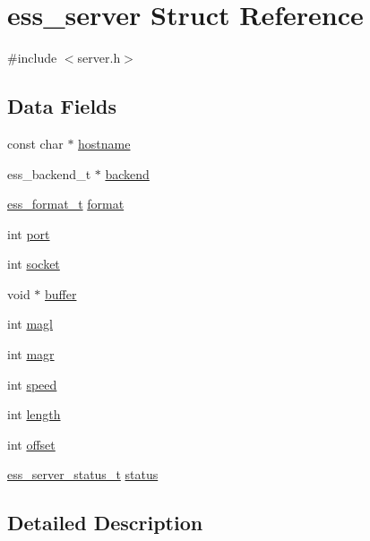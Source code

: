 \hypertarget{structess__server}{}\section{ess\+\_\+server Struct Reference}
\label{structess__server}


{\ttfamily \#include $<$server.\+h$>$}

\subsection*{Data Fields}
\begin{DoxyCompactItemize}
\item 
const char $\ast$ \hyperlink{structess__server_aad01339e89106fdf68f57ef118956fa9}{hostname}
\item 
ess\+\_\+backend\+\_\+t $\ast$ \hyperlink{structess__server_ab2b85d146ada2907a81371aace6e926d}{backend}
\item 
\hyperlink{ess__format_8h_ab03f24cb5d42f4448f713bf1ec178163}{ess\+\_\+format\+\_\+t} \hyperlink{structess__server_abb4395d1c05d3bbc2e1d011507ddd19b}{format}
\item 
int \hyperlink{structess__server_a63c89c04d1feae07ca35558055155ffb}{port}
\item 
int \hyperlink{structess__server_a3666576f6b88007cc7b8f26c7da596c8}{socket}
\item 
void $\ast$ \hyperlink{structess__server_a368f7094dc38acca20612bbb392552f4}{buffer}
\item 
int \hyperlink{structess__server_a1aa199bcd52f6acf8edbf2ee6898a21b}{magl}
\item 
int \hyperlink{structess__server_a64b10d79850e935f9440886335b9f391}{magr}
\item 
int \hyperlink{structess__server_a218b4f7c6cc2681a99c23a3b089d68b1}{speed}
\item 
int \hyperlink{structess__server_a9f59b34b1f25fe00023291b678246bcc}{length}
\item 
int \hyperlink{structess__server_aed7ea92f45bd273dde380a45ddced592}{offset}
\item 
\hyperlink{server_8h_a66019638fd44eba9d951ec93754c7b8d}{ess\+\_\+server\+\_\+status\+\_\+t} \hyperlink{structess__server_af34befa103928930a907b2eb5cc4739c}{status}
\end{DoxyCompactItemize}


\subsection{Detailed Description}


